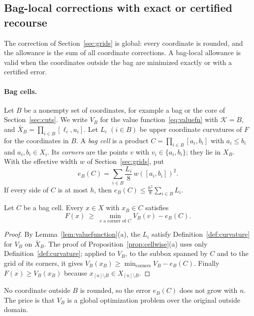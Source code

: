 \subsection{Bag-local corrections with exact or certified recourse}\label{sec:local}
The correction of Section~\ref{sec:grids} is global: every coordinate is
rounded, and the allowance is the sum of all coordinate corrections. A
bag-local allowance is valid when the coordinates outside the bag are
minimized exactly or with a certified error.

\paragraph{Bag cells.}
Let $B$ be a nonempty set of coordinates, for example a bag or the core of
Section~\ref{sec:cuts}. We write $V_B$ for the value
function~\eqref{eq:valuefn} with $\mathcal K=B$, and
$\bar X_B=\prod_{i\in B}[\ell_i,u_i]$. Let $L_i$ $(i\in B)$ be upper
coordinate curvatures of $F$ for the coordinates in $B$. A \emph{bag cell}
is a product $C=\prod_{i\in B}[a_i,b_i]$ with $a_i\le b_i$ and
$a_i,b_i\in X_i$. Its \emph{corners} are the points $v$ with
$v_i\in\{a_i,b_i\}$; they lie in $X_B$. With the effective width $w$ of
Section~\ref{sec:grids}, put
\[
e_B(C)=\sum_{i\in B}\frac{L_i}8\,w([a_i,b_i])^2 .
\]
If every side of $C$ is at most $h$, then $e_B(C)\le\frac{h^2}8\sum_{i\in B}L_i$.

\begin{lemma}\label{lem:cr-cell}
Let $C$ be a bag cell. Every $x\in X$ with $x_B\in C$ satisfies
\[
F(x)\ \ge\ \min_{v\text{ a corner of }C}V_B(v)-e_B(C).
\]
\end{lemma}
\begin{proof}
By Lemma~\ref{lem:valuefunction}(a), the $L_i$ satisfy
Definition~\ref{def:curvature} for $V_B$ on $\bar X_B$. The proof of
Proposition~\ref{prop:cellwise}(a) uses only Definition~\ref{def:curvature};
applied to $V_B$, to the subbox spanned by $C$ and to the grid of its
corners, it gives $V_B(x_B)\ge\min_{\text{corners}}V_B-e_B(C)$. Finally
$F(x)\ge V_B(x_B)$ because $x_{[n]\setminus B}\in X_{[n]\setminus B}$.
\end{proof}

No coordinate outside $B$ is rounded, so the error $e_B(C)$ does not grow
with $n$. The price is that $V_B$ is a global optimization problem over the
original outside domain.

